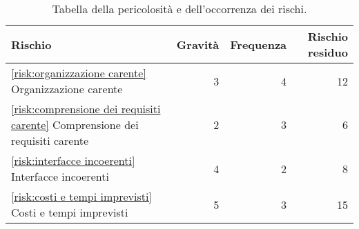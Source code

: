 \begin{table}[H]
\begin{tabular}{l|r|r|r}
		\hline
		\textbf{Rischio}                                                                     & \textbf{Gravità} & \textbf{Frequenza} & \textbf{Rischio residuo} \\
		\hline
		\autoref{risk:organizzazione carente} Organizzazione carente                         & 3                & 4                  & 12                       \\
		\autoref{risk:comprensione dei requisiti carente} Comprensione dei requisiti carente & 2                & 3                  & 6                        \\
		\autoref{risk:interfacce incoerenti} Interfacce incoerenti                           & 4                & 2                  & 8                        \\
		\autoref{risk:costi e tempi imprevisti} Costi e tempi imprevisti                     & 5                & 3                  & 15                       \\
		\hline
	\end{tabular}
	\caption{Tabella della pericolosità e dell'occorrenza dei rischi.}
\end{table}

